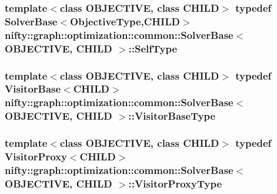 \subsubsection[{Self\+Type}]{\setlength{\rightskip}{0pt plus 5cm}template$<$class O\+B\+J\+E\+C\+T\+I\+V\+E, class C\+H\+I\+L\+D$>$ typedef {\bf Solver\+Base}$<${\bf Objective\+Type},C\+H\+I\+L\+D$>$ {\bf nifty\+::graph\+::optimization\+::common\+::\+Solver\+Base}$<$ O\+B\+J\+E\+C\+T\+I\+V\+E, C\+H\+I\+L\+D $>$\+::{\bf Self\+Type}}\label{classnifty_1_1graph_1_1optimization_1_1common_1_1SolverBase_ae445fe93efdb410186debfa5a248dfad}
\hypertarget{classnifty_1_1graph_1_1optimization_1_1common_1_1SolverBase_a5a14d64c70a9cc0eebc7d71d2b089f9b}{}
\subsubsection[{Visitor\+Base\+Type}]{\setlength{\rightskip}{0pt plus 5cm}template$<$class O\+B\+J\+E\+C\+T\+I\+V\+E, class C\+H\+I\+L\+D$>$ typedef {\bf Visitor\+Base}$<$C\+H\+I\+L\+D$>$ {\bf nifty\+::graph\+::optimization\+::common\+::\+Solver\+Base}$<$ O\+B\+J\+E\+C\+T\+I\+V\+E, C\+H\+I\+L\+D $>$\+::{\bf Visitor\+Base\+Type}}\label{classnifty_1_1graph_1_1optimization_1_1common_1_1SolverBase_a5a14d64c70a9cc0eebc7d71d2b089f9b}
\hypertarget{classnifty_1_1graph_1_1optimization_1_1common_1_1SolverBase_a58913ea9ab9232ff72608b710c1012d0}{}
\subsubsection[{Visitor\+Proxy\+Type}]{\setlength{\rightskip}{0pt plus 5cm}template$<$class O\+B\+J\+E\+C\+T\+I\+V\+E, class C\+H\+I\+L\+D$>$ typedef {\bf Visitor\+Proxy}$<$C\+H\+I\+L\+D$>$ {\bf nifty\+::graph\+::optimization\+::common\+::\+Solver\+Base}$<$ O\+B\+J\+E\+C\+T\+I\+V\+E, C\+H\+I\+L\+D $>$\+::{\bf Visitor\+Proxy\+Type}}\label{classnifty_1_1graph_1_1optimization_1_1common_1_1SolverBase_a58913ea9ab9232ff72608b710c1012d0}


